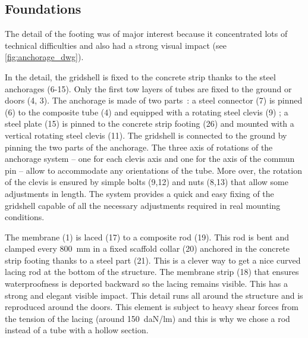 %


\clearpage
\subsection{Foundations}
The detail of the footing was of major interest because it concentrated lots of technical difficulties and also had a strong visual impact (see \cref{fig:anchorage_dwg}).

In the detail, the gridshell is fixed to the concrete strip thanks to the steel anchorages (6-15). Only the first tow layers of tubes are fixed to the ground or doors (4, 3). The anchorage is made of two parts~: a steel connector (7) is pinned (6) to the composite tube (4) and equipped with a rotating steel clevis (9) ; a steel plate (15) is pinned to the concrete strip footing (26) and mounted with a vertical rotating steel clevis (11). The gridshell is connected to the ground by pinning the two parts of the anchorage. The three axis of rotations of the anchorage system -- one for each clevis axis and one for the axis of the commun pin -- allow to accommodate any orientations of the tube. More over, the rotation of the clevis is ensured by simple bolts (9,12) and nuts (8,13) that allow some adjustments in length. The system provides a quick and easy fixing of the gridshell capable of all the necessary adjustments required in real mounting conditions.

The membrane (1) is laced (17) to a composite rod (19). This rod is bent and clamped every \SI{800}{mm} in a fixed scaffold collar (20) anchored in the concrete strip footing thanks to a steel part (21). This is a clever way to get a nice curved lacing rod at the bottom of the structure. The membrane strip (18) that ensures waterproofness is deported backward so the lacing remains visible. This has a strong and elegant visible impact. This detail runs all around the structure and is reproduced around the doors. This element is subject to heavy shear forces from the tension of the lacing (around \SI{150}{daN/lm}) and this is why we chose a rod instead of a tube with a hollow section.

